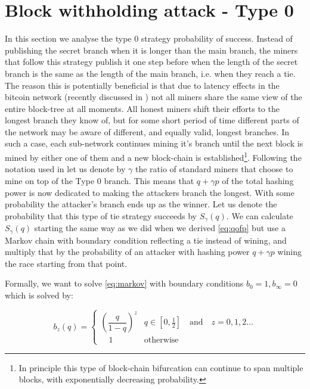 \documentclass[letterpaper,12pt]{report}
\theoremstyle{plain}
\theoremstyle{definition}
\begin{document}
\section{Block withholding attack - Type 0}
In this section we analyse the type 0 strategy probability of success.
Instead of publishing the secret branch when it is longer than the main branch, the miners that follow this strategy publish it one step before when the length of the secret branch is the same as the length of the main branch, i.e. when they reach a tie. The reason this is potentially beneficial is that due to latency effects in the bitcoin network (recently discussed in \cite{Zoharetal}) not all miners share the same view of the entire block-tree at all moments. All honest miners shift their efforts to the longest branch they know of, but for some short period of time different parts of the network may be aware of different, and equally valid, longest branches. In such a case, each sub-network continues mining it's branch until the next block is mined by either one of them and a new block-chain is established\footnote{In principle this type of block-chain bifurcation can continue to span multiple blocks, with exponentially decreasing probability.}. 
Following the notation used in \cite{Selfish} let us denote by $\gamma$ the ratio of standard miners that choose to mine on top of the Type 0 branch.
This means that $q+\gamma p$ of the total hashing power is now dedicated to making the attackers branch the longest. With some probability the attacker's branch ends up as the winner. Let us denote the probability that this type of tie strategy succeeds by $S_{\gamma}(q)$.
We can calculate $S_{\gamma}(q)$ starting the same way as we did when we derived \ref{eq:qofp} but use a Markov chain with boundary condition reflecting a tie instead of wining, and multiply that by the probability of an attacker with hashing power $q+\gamma p$ wining the race starting from that point.

Formally, we want to solve \ref{eq:markov} with boundary conditions $b_0=1, b_\infty=0$ which is solved by:

\begin{equation}\label{eq:bz}
\mathit{b}_z(q)=\begin{cases}\left( \dfrac{q}{1-q}\right)^z & q\in [0,\frac{1}{2}] \quad \mathrm{and} \quad z=0,1,2\dots \\ \quad 1 & \mathrm{otherwise} \end{cases}
\end{equation}
\end{document}
